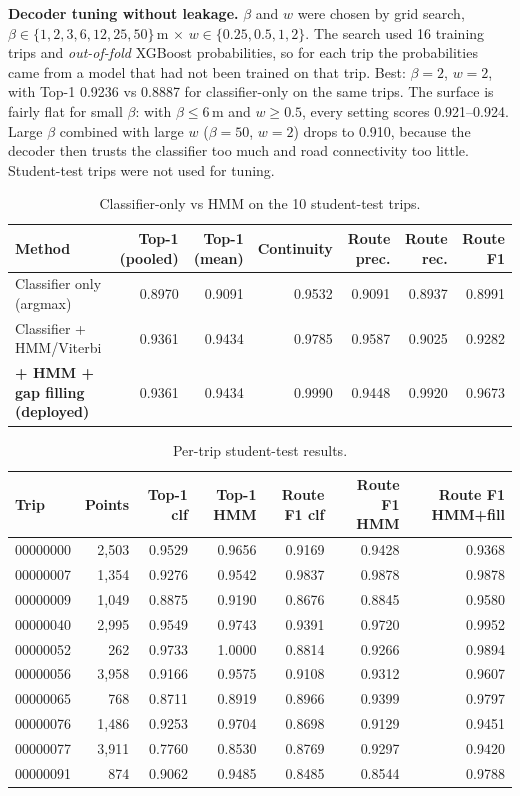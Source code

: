 \documentclass[10pt,a4paper]{article}
\begin{document}
\textbf{Decoder tuning without leakage.} $\beta$ and $w$ were chosen by grid search, $\beta\in\{1,2,3,6,12,25,50\}$\,m $\times$ $w\in\{0.25,0.5,1,2\}$. The search used 16 training trips and \emph{out-of-fold} XGBoost probabilities, so for each trip the probabilities came from a model that had not been trained on that trip. Best: $\beta=2$, $w=2$, with Top-1 0.9236 vs 0.8887 for classifier-only on the same trips. The surface is fairly flat for small $\beta$: with $\beta\le6$\,m and $w\ge0.5$, every setting scores 0.921--0.924. Large $\beta$ combined with large $w$ ($\beta=50$, $w=2$) drops to 0.910, because the decoder then trusts the classifier too much and road connectivity too little. Student-test trips were not used for tuning.

\begin{table}[H]\centering\footnotesize
\caption{Classifier-only vs HMM on the 10 student-test trips.}
\setlength{\tabcolsep}{3pt}
\begin{tabular}{lrrrrrr}
\toprule
Method & Top-1 (pooled) & Top-1 (mean) & Continuity & Route prec. & Route rec. & Route F1\\
\midrule
Classifier only (argmax) & 0.8970 & 0.9091 & 0.9532 & 0.9091 & 0.8937 & 0.8991\\
Classifier + HMM/Viterbi & 0.9361 & 0.9434 & 0.9785 & 0.9587 & 0.9025 & 0.9282\\
\rowcolor{best}\textbf{+ HMM + gap filling (deployed)} & 0.9361 & 0.9434 & 0.9990 & 0.9448 & 0.9920 & 0.9673\\
\bottomrule
\end{tabular}
\end{table}
\begin{table}[H]\centering\small
\caption{Per-trip student-test results.}
\begin{tabular}{lrrrrrr}
\toprule
Trip & Points & Top-1 clf & Top-1 HMM & Route F1 clf & Route F1 HMM & Route F1 HMM+fill\\
\midrule
00000000 & 2{,}503 & 0.9529 & 0.9656 & 0.9169 & 0.9428 & 0.9368\\
00000007 & 1{,}354 & 0.9276 & 0.9542 & 0.9837 & 0.9878 & 0.9878\\
00000009 & 1{,}049 & 0.8875 & 0.9190 & 0.8676 & 0.8845 & 0.9580\\
00000040 & 2{,}995 & 0.9549 & 0.9743 & 0.9391 & 0.9720 & 0.9952\\
00000052 & 262 & 0.9733 & 1.0000 & 0.8814 & 0.9266 & 0.9894\\
00000056 & 3{,}958 & 0.9166 & 0.9575 & 0.9108 & 0.9312 & 0.9607\\
00000065 & 768 & 0.8711 & 0.8919 & 0.8966 & 0.9399 & 0.9797\\
00000076 & 1{,}486 & 0.9253 & 0.9704 & 0.8698 & 0.9129 & 0.9451\\
00000077 & 3{,}911 & 0.7760 & 0.8530 & 0.8769 & 0.9297 & 0.9420\\
00000091 & 874 & 0.9062 & 0.9485 & 0.8485 & 0.8544 & 0.9788\\
\bottomrule
\end{tabular}
\end{table}
\end{document}
